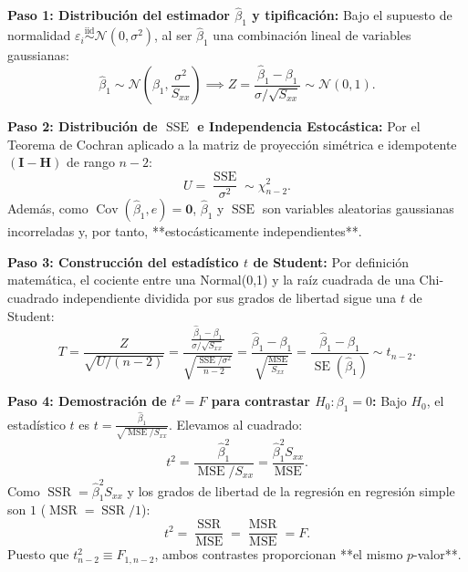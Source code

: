 \documentclass[11pt,a4paper]{article}
\begin{document}
\begin{demobox}[Derivación del estadístico $t$ y prueba de que $t^2 = F$]
\textbf{Paso 1: Distribución del estimador $\hat{\beta}_1$ y tipificación:}  
Bajo el supuesto de normalidad $\varepsilon_i \overset{\text{iid}}{\sim} \mathcal{N}(0, \sigma^2)$, al ser $\hat{\beta}_1$ una combinación lineal de variables gaussianas:
\begin{equation}
\hat{\beta}_1 \sim \mathcal{N}\left( \beta_1, \frac{\sigma^2}{S_{xx}} \right) \implies Z = \frac{\hat{\beta}_1 - \beta_1}{\sigma / \sqrt{S_{xx}}} \sim \mathcal{N}(0, 1).
\end{equation}

\textbf{Paso 2: Distribución de $\operatorname{SSE}$ e Independencia Estocástica:}  
Por el Teorema de Cochran aplicado a la matriz de proyección simétrica e idempotente $(\mathbf{I} - \mathbf{H})$ de rango $n-2$:
\begin{equation}
U = \frac{\operatorname{SSE}}{\sigma^2} \sim \chi^2_{n-2}.
\end{equation}
Además, como $\operatorname{Cov}(\hat{\beta}_1, e) = \mathbf{0}$, $\hat{\beta}_1$ y $\operatorname{SSE}$ son variables aleatorias gaussianas incorreladas y, por tanto, **estocásticamente independientes**.

\textbf{Paso 3: Construcción del estadístico $t$ de Student:}  
Por definición matemática, el cociente entre una Normal(0,1) y la raíz cuadrada de una Chi-cuadrado independiente dividida por sus grados de libertad sigue una $t$ de Student:
\begin{equation}
T = \frac{Z}{\sqrt{U / (n-2)}} = \frac{\frac{\hat{\beta}_1 - \beta_1}{\sigma / \sqrt{S_{xx}}}}{\sqrt{\frac{\operatorname{SSE}/\sigma^2}{n-2}}} = \frac{\hat{\beta}_1 - \beta_1}{\sqrt{\frac{\operatorname{MSE}}{S_{xx}}}} = \frac{\hat{\beta}_1 - \beta_1}{\operatorname{SE}(\hat{\beta}_1)} \sim t_{n-2}.
\end{equation}

\textbf{Paso 4: Demostración de $t^2 = F$ para contrastar $H_0: \beta_1 = 0$:}  
Bajo $H_0$, el estadístico $t$ es $t = \frac{\hat{\beta}_1}{\sqrt{\operatorname{MSE}/S_{xx}}}$. Elevamos al cuadrado:
\begin{equation}
t^2 = \frac{\hat{\beta}_1^2}{\operatorname{MSE}/S_{xx}} = \frac{\hat{\beta}_1^2 S_{xx}}{\operatorname{MSE}}.
\end{equation}
Como $\operatorname{SSR} = \hat{\beta}_1^2 S_{xx}$ y los grados de libertad de la regresión en regresión simple son $1$ ($\operatorname{MSR} = \operatorname{SSR}/1$):
\begin{equation}
t^2 = \frac{\operatorname{SSR}}{\operatorname{MSE}} = \frac{\operatorname{MSR}}{\operatorname{MSE}} = F.
\end{equation}
Puesto que $t_{n-2}^2 \equiv F_{1, n-2}$, ambos contrastes proporcionan **el mismo $p$-valor**.
\end{demobox}
\end{document}
